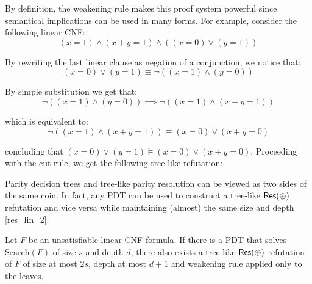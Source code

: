 By definition, the weakening rule makes this proof system powerful since semantical implications can be used in many forms. For example, consider the following linear CNF:
\[(x = 1) \land (x+y = 1) \land ((x = 0) \lor (y = 1))\]

By rewriting the last linear clause as negation of a conjunction, we notice that:
\[(x = 0) \lor (y = 1) \equiv \lnot ((x = 1) \land (y = 0))\]

By simple substitution we get that:
\[\lnot ((x = 1) \land (y = 0)) \implies  \lnot ((x = 1) \land (x+y = 1))\]

which is equivalent to:
\[\lnot ((x = 1) \land (x+y = 1)) \equiv  (x = 0) \lor (x+y = 0)\]

concluding that $(x = 0) \lor (y = 1) \models (x = 0) \lor (x+y = 0)$. Proceeding with the cut rule, we get the following tree-like refutation:
\begin{figure}[H]
    \centering
    
\end{figure}

Parity decision trees and tree-like parity resolution can be viewed as two sides of the same coin. In fact, any PDT can be used to construct a tree-like $\mathsf{Res(\oplus)}$ refutation and vice versa while maintaining (almost) the same size and depth \cref{res_lin_2}.

\begin{lemma}
    Let $F$ be an unsatisfiable linear CNF formula. If there is a PDT that solves $\mathrm{Search}(F)$ of size $s$ and depth $d$, there also exists a tree-like $\mathsf{Res(\oplus)}$ refutation of $F$ of size at most $2s$, depth at most $d+1$ and weakening rule applied only to the leaves.
\end{lemma}


